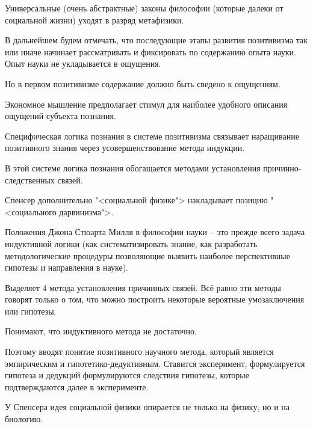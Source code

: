 \documentclass[main.tex]{subfiles}
\begin{document}
Универсальные (очень абстрактные) законы философии (которые далеки от социальной жизни) уходят в разряд метафизики.



В дальнейшем будем отмечать, что последующие этапы развития позитивизма так или иначе начинает рассматривать и фиксировать по содержанию опыта науки.
Опыт науки не укладывается в ощущения.

Но в первом позитивизме содержание должно быть сведено к ощущениям.

Экономное мышление предполагает стимул для наиболее удобного описания ощущений субъекта познания.

Специфическая логика познания в системе позитивизма связывает наращивание позитивного знания через усовершенствование метода индукции.

В этой системе логика познания обогащается методами установления причинно-следственных связей.



Спенсер дополнительно "<социальной физике"> накладывает позицию "<социального дарвинизма">.



Положения Джона Стюарта Милля в философии науки -- это прежде всего задача индуктивной логики (как систематизировать знание, как разработать методологические процедуры позволяющие выявить наиболее перспективные гипотезы и направления в науке).

Выделяет 4 метода установления причинных связей.
Всё равно эти методы говорят только о том, что можно построить некоторые вероятные умозаключения или гипотезы. 



Понимают, что индуктивного метода не достаточно.

Поэтому вводят понятие позитивного научного метода, который является эмпирическим и гипотетико-дедуктивным.
Ставится эксперимент, формулируется гипотеза и дедукций формулируются следствия гипотезы, которые подтверждаются далее в эксперименте.

У Спенсера идея социальной физики опирается не только на физику, но и на биологию.
\end{document}
